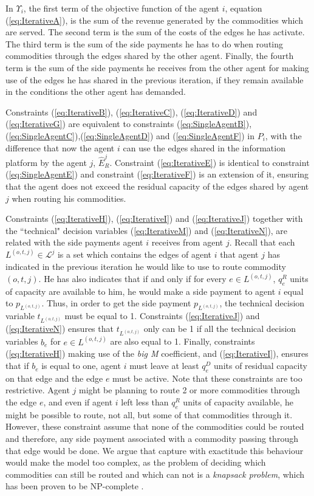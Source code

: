 \documentclass[review]{elsarticle}
\begin{document}
In $\Upsilon_i$, the first term of the objective function of the agent $i$, equation (\ref{eq:IterativeA}), is the sum of the revenue generated by the commodities which are served. The second term is the sum of the costs of the edges he has activate. The third term is the sum of the side payments he has to do when routing commodities through the edges shared by the other agent. Finally, the fourth term is the sum of the side payments he receives from the other agent for making use of the edges he has shared in the previous iteration, if they remain available in the conditions the other agent has demanded.

Constraints (\ref{eq:IterativeB}), (\ref{eq:IterativeC}), (\ref{eq:IterativeD}) and (\ref{eq:IterativeG}) are equivalent to constraints (\ref{eq:SingleAgentB}),(\ref{eq:SingleAgentC}),(\ref{eq:SingleAgentD}) and (\ref{eq:SingleAgentF}) in $P_i$, with the difference that now the agent $i$ can use the edges shared in the information platform by the agent $j$, $\widehat{E}_R^j$. Constraint (\ref{eq:IterativeE}) is identical to constraint (\ref{eq:SingleAgentE}) and constraint (\ref{eq:IterativeF}) is an extension of it, ensuring that the agent does not exceed the residual capacity of the edges shared by agent $j$ when routing his commodities.

Constraints (\ref{eq:IterativeH}),  (\ref{eq:IterativeI}) and (\ref{eq:IterativeJ}) together with the ``technical" decision variables (\ref{eq:IterativeM}) and (\ref{eq:IterativeN}), are related with the side payments agent $i$ receives from agent $j$. Recall that each $L^{(o,t,j)} \in \mathcal{L}^j$ is a set which contains the edges of agent $i$ that agent $j$ has indicated in the previous iteration he would like to use to route commodity $(o,t,j)$. He has also indicates that if and only if for every $e \in L^{(o,t,j)}$, $q_e^R$ units of capacity are available to him, he would make a side payment to agent $i$ equal to $p_{L^{(o,t,j)}}$. Thus, in order to get the side payment $p_{L^{(o,t,j)}}$, the technical decision variable $t_{L^{(o,t,j)}}$ must be equal to 1. Constraints (\ref{eq:IterativeJ}) and (\ref{eq:IterativeN}) ensures that $t_{L^{(o,t,j)}}$ only can be 1 if all the technical decision variables $b_e$ for $e \in L^{(o,t,j)}$ are also equal to 1. Finally, constraints (\ref{eq:IterativeH})  making use of the \emph{big M} coefficient, and (\ref{eq:IterativeI}), ensures that if $b_e$ is equal to one, agent $i$ must leave at least $q_e^D$ units of residual capacity on that edge and the edge $e$ must be active. Note that these constraints are too restrictive. Agent $j$ might be planning to route 2 or more commodities through the edge $e$, and even if agent $i$ left less than $q_e^R$ units of capacity available, he might be possible to route, not all, but some of that commodities through it. However, these constraint assume that none of the commodities could be routed and therefore, any side payment associated with a commodity passing through that edge would be done. We argue that capture with exactitude this behaviour would make the model too complex, as the problem of deciding which commodities can still be routed and which can not is a \emph{knapsack problem}, which has been proven to be NP-complete \cite{KARP1972}.
\end{document}
